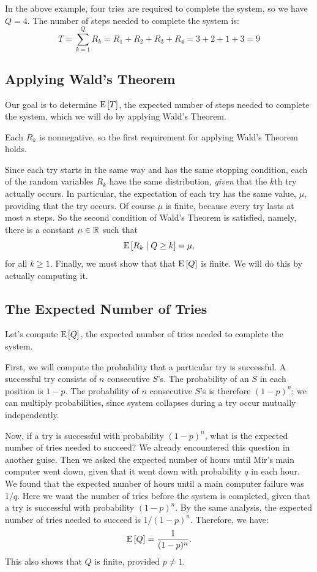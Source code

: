 \documentclass[11pt,twoside]{article}
\begin{document}
In the above example, four tries are required to complete the system,
so we have $Q = 4$.  The number of steps needed to complete the system
is:
\[
T = \sum_{k=1}^Q R_k = R_1 + R_2 + R_3 + R_4 = 3 + 2 + 1 + 3 = 9
\]

\subsection{Applying Wald's Theorem}

Our goal is to determine $\mathop{\textup{E}}\nolimits\left[T\right]$, the expected number of steps needed
to complete the system, which we will do by applying Wald's Theorem.

Each $R_k$ is nonnegative, so the first requirement for applying Wald's
Theorem holds.

Since each try starts in the same way and has the same stopping condition,
each of the random variables $R_k$ have the same distribution,
\emph{given} that the $k$th try actually occurs.  In particular, the
expectation of each try has the same value, $\mu$, providing that the try
occurs.  Of course $\mu$ is finite, because every try lasts at most $n$
steps.  So the second condition of Wald's Theorem is satisfied, namely,
there is a constant $\mu \in \mathbb{R}$ such that
\[
\mathop{\textup{E}}\nolimits\left[R_k\mid Q \geq k\right] = \mu,
\]
for all $k\geq 1$.  Finally, we must show that that $\mathop{\textup{E}}\nolimits\left[Q\right]$ is
finite.  We will do this by actually computing it.

\subsection{The Expected Number of Tries}

Let's compute $\mathop{\textup{E}}\nolimits\left[Q\right]$, the expected number of tries needed to
complete the system.

First, we will compute the probability that a particular try is
successful.  A successful try consists of $n$ consecutive $S$'s.  The
probability of an $S$ in each position is $1-p$.  The probability of $n$
consecutive $S$'s is therefore $(1-p)^n$; we can multiply probabilities,
since system collapses during a try occur mutually independently.

Now, if a try is successful with probability $(1-p)^n$, what is the
expected number of tries needed to succeed?  We already encountered this
question in another guise.  Then we asked the expected number of hours
until Mir's main computer went down, given that it went down with
probability $q$ in each hour.  We found that the expected number of hours
until a main computer failure was $1/q$.  Here we want the number
of tries before the system is completed, given that a try is successful
with probability $(1-p)^n$.  By the same analysis, the expected number of
tries needed to succeed is $1/(1-p)^n$.  Therefore, we have:
\begin{equation}\label{eQ}
\mathop{\textup{E}}\nolimits\left[Q\right] = \frac{1}{(1-p)^n}.
\end{equation}
This also shows that $Q$ is finite, provided $p \neq 1$.
\end{document}
